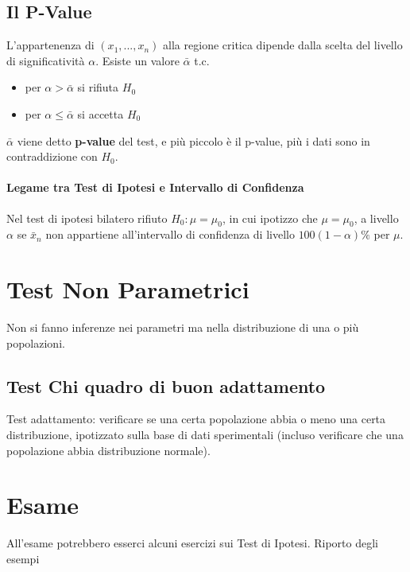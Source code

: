 \subsection{Il P-Value}
L'appartenenza di $(x_1, ..., x_n)$ alla regione critica dipende dalla scelta del livello di significatività $\alpha$.
Esiste un valore $\bar{\alpha}$ t.c.
\begin{itemize}
    \item per $\alpha > \bar{\alpha}$ si rifiuta $H_0$
    \item per $\alpha \leq \bar{\alpha}$ si accetta $H_0$
\end{itemize}
$\bar{\alpha}$ viene detto \textbf{p-value} del test, e più piccolo è il p-value, più i dati sono in contraddizione con $H_0$.
\paragraph*{Legame tra Test di Ipotesi e Intervallo di Confidenza}
Nel test di ipotesi bilatero rifiuto $H_0: \mu=\mu_0$, in cui ipotizzo che $\mu=\mu_0$, a livello $\alpha$ se $\bar{x}_n$ non 
appartiene all'intervallo di confidenza di livello $100(1-\alpha)\%$ per $\mu$.


\section*{Test Non Parametrici} Non si fanno inferenze nei parametri ma nella
distribuzione di una o più popolazioni.
\subsection{Test Chi quadro di buon adattamento}
Test adattamento: verificare se una certa popolazione abbia o meno una certa distribuzione,
ipotizzato sulla base di dati sperimentali (incluso verificare che una popolazione
abbia distribuzione normale).



\section{Esame}
All'esame potrebbero esserci alcuni esercizi sui Test di Ipotesi. Riporto degli esempi

